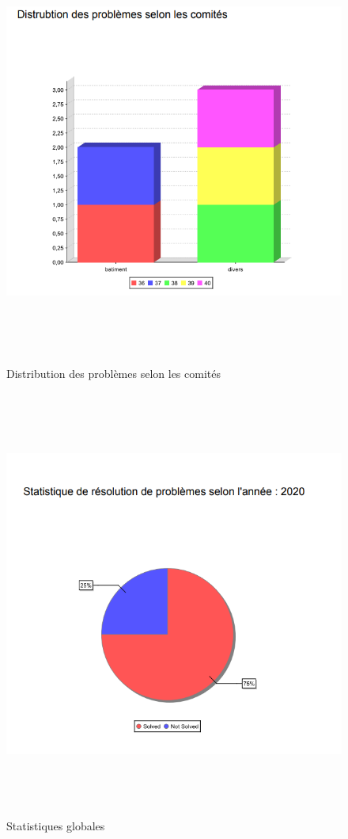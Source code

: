 \documentclass[11.5pt]{report}
\begin{document}
\begin{figure}[h]
	
	\begin{center}
		\includegraphics[width=500pt,height=400pt]{d2.png} 
		\caption{Distribution des problèmes selon les comités }
	\end{center}
	
\end{figure}
\newpage
\begin{figure}[h]
	
	\begin{center}
		\includegraphics[width=500pt,height=400pt]{sg.png} 
		\caption{Statistiques globales}
	\end{center}
	
\end{figure}
\end{document}
